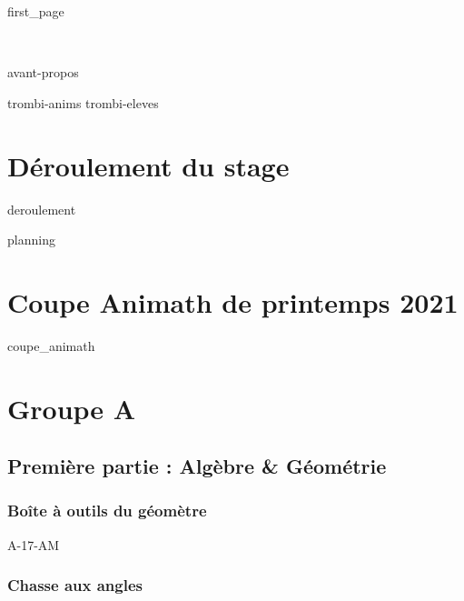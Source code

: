 \documentclass[poly,trombi]{valbonne}
\begin{document}
{first_page}

\pagestyle{empty}~

\pagebreak

\clearpage

{avant-propos}

\pagestyle{plain}

\footnotesize
\pagestyle{trombi}
{trombi-anims}
\newpage
{trombi-eleves}


\normalsize

\pagestyle{empty}

\renewcommand{\headrulewidth}{0.4pt}

\tableofcontents

\chapter{Déroulement du stage}
\pagestyle{plain}

{deroulement}

{planning}

\chapter{Coupe Animath de printemps 2021}

{coupe_animath}






\chapter{Groupe A}

\minitoc \clearpage

\section{Première partie : Algèbre \& Géométrie}

\subsection{Boîte à outils du géomètre}

{A-17-AM}

\subsection{Chasse aux angles}
\end{document}
